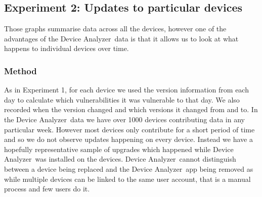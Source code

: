 \documentclass[conference,a4paper,twoside]{IEEEtran}
\newcommand{\da}{Device Analyzer}
\begin{document}
\subsection{Experiment 2: Updates to particular devices}\label{sec:exp:device_updates}
Those graphs summarise data across all the devices, however one of the advantages of the \da\ data is that it allows us to look at what happens to individual devices over time.

\subsubsection{Method}
As in Experiment 1, for each device we used the version information from each day to calculate which vulnerabilities it was vulnerable to that day.
We also recorded when the version changed and which versions it changed from and to.
In the \da\ data we have over 1000 devices contributing data in any particular week.
However most devices only contribute for a short period of time and so we do not observe updates happening on every device.
Instead we have a hopefully representative sample of upgrades which happened while \da\ was installed on the devices.
\da\ cannot distinguish between a device being replaced and the \da\ app being removed as while multiple devices can be linked to the same user account, that is a manual process and few users do it.
\end{document}

